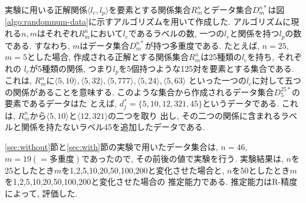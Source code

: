 実験に用いる正解関係$\langle l_c,l_p \rangle$を要素とする関係集合$R_m^n$とデータ集合$D^{n*}_m$は図
\ref{algo:randomnum-data}に示すアルゴリズムを用いて作成した. 
アルゴリズムに現れる$n,m$はそれぞれ$R_m^n$において$l_c$であるラベルの数, 一つの$l_c$と関係を持つ$l_p$の数である. 
すなわち, $m$はデータ集合$D^{n*}_m$が持つ多重度である. 
たとえば, $n = 25$, $m = 5$とした場合, 
作成される正解とする関係集合$R_m^n$は25種類の$l_c$を持ち, それぞれの
$l_c$が5種類の関係, つまり$l_p$を5個持つような125対を要素とする集合である. 
これは, $R_m^n$に$\langle 5,10\rangle,\langle 5,32\rangle,
\langle 5,777\rangle,\langle 5,24\rangle,\langle 5,63\rangle$
といった一つの$l_c$に対して五つの関係があることを意味する. 
このような集合から作成されるデータ集合$D^{25*}_{5}$の要素であるデータはた
とえば, 
$d^{*}_{j} =\{5,10,12,321,45\}$というデータである. 
これは, $R_m^n$から$\langle 5,10\rangle$と$\langle 12,321\rangle$の二つを取り
出し, その二つの関係に含まれるラベルと関係を持たないラベル45を追加したデータである. 

\ref{sec:without}節と\ref{sec:with}節の実験で用いたデータ集合は, $n = 46$, $m = 19
(= 多重度)$であったので, その前後の値で実験を行う. 
実験結果は, $n$を25としたとき$m$を1,2,5,10,20,50,100,200と変化させた場合と, 
$n$を50としたとき$m$を1,2,5,10,20,50,100,200と変化させた場合の
推定能力である. 
推定能力はR-精度によって, 評価した. 

